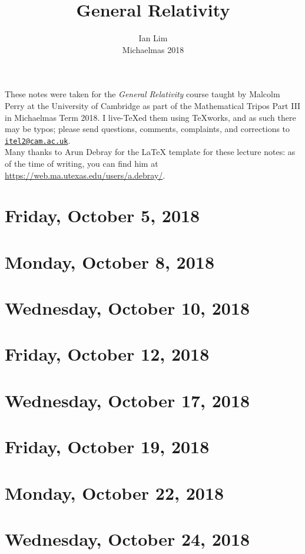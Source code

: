\documentclass[reqno]{amsart}
\begin{document}
\title{General Relativity}
\author{Ian Lim\\ Michaelmas 2018}
\maketitle
{\small\noindent These notes were taken for the \textit{General Relativity} course taught by Malcolm Perry at the University of Cambridge as part of the Mathematical Tripos Part III in Michaelmas Term 2018. I live-\TeX ed them using TeXworks, and as such there may be typos; please send questions, comments, complaints, and corrections to 
\href{mailto:itel2@cam.ac.uk?subject=GR\%20Lecture\%20Notes}{\texttt{itel2@cam.ac.uk}}.\\
Many thanks to Arun Debray for the {\LaTeX} template for these lecture notes: as of the time of writing, you can find him at \url{https://web.ma.utexas.edu/users/a.debray/}.}

\tableofcontents

\section{Friday, October 5, 2018}
	

\section{Monday, October 8, 2018}
	

\section{Wednesday, October 10, 2018}
	

\section{Friday, October 12, 2018}
	

\section{Wednesday, October 17, 2018}
    

\section{Friday, October 19, 2018}
    
    
\section{Monday, October 22, 2018}
    
    
\section{Wednesday, October 24, 2018}
    
\end{document}
